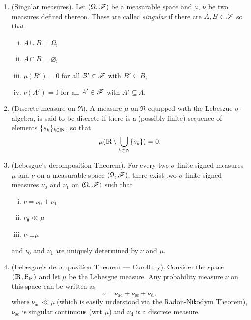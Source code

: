 \documentclass[a4paper,10pt]{article}
\begin{document}
\begin{enumerate}
 \item (Singular measures). Let $(\Omega, \mathscr{F})$ be a measurable space and $\mu$, $\nu$
       be two measures defined thereon. These are called \textit{singular} if there are 
       $A,B\in\mathscr{F}$ so that
       \begin{enumerate}[i.]
        \item $A\cup B=\Omega$, 
        \item $A\cap B=\varnothing$,
        \item $\mu(B')=0$ for all $B'\in\mathscr{F}$ with $B'\subseteq B$,
        \item $\nu(A')=0$ for all $A'\in\mathscr{F}$ with $A'\subseteq A$.
       \end{enumerate}
 \item (Discrete measure on $\Re$). A measure $\mu$ on $\Re$ equipped with the Lebesgue $\sigma$-algebra,
       is said to be discrete if there is a (possibly finite) sequence of elements $\{s_k\}_{k\in\N}$,
       so that 
       \[
        \mu(\Re\setminus \bigcup_{k\in\N} \{s_k\}) = 0.
       \]
 \item (Lebesgue's decomposition Theorem). For every two $\sigma$-finite signed measures $\mu$ and $\nu$
       on a measurable space $(\Omega, \mathscr{F})$, there exist two $\sigma$-finite signed measures $\nu_0$ and $\nu_1$ 
       on $(\Omega, \mathscr{F})$ such that
       \begin{enumerate}[i.]
        \item $\nu = \nu_0 + \nu_1$
        \item $\nu_0\ll \mu$
        \item $\nu_1 {}\bot{} \mu$
       \end{enumerate}
       and $\nu_0$ and $\nu_1$ are uniquely determined by $\nu$ and $\mu$.
\item (Lebesgue's decomposition Theorem --- Corollary).
      Consider the space $(\Re,\B_\Re)$ and let $\mu$ be the Lebesgue measure. Any probability measure $\nu$
      on this space can be written as
      \[
       \nu = \nu_{\text{ac}} + \nu_{\text{sc}} + \nu_{\text{d}},
      \]
      where $\nu_{\text{ac}} \ll \mu$ (which is easily understood via the 
      Radon-Nikodym Theorem), $\nu_{\text{sc}}$ is singular continuous (wrt $\mu$) and $\nu_{\text{d}}$
      is a discrete measure.
             
\end{enumerate}
\end{document}
